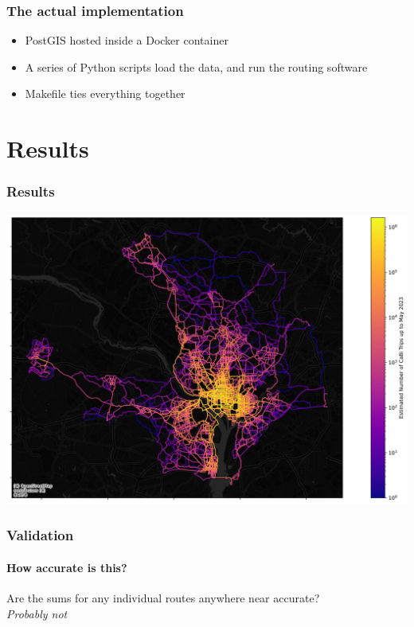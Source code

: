 \documentclass{beamer}
\begin{document}
\begin{frame}
    \frametitle{The actual implementation}

    \begin{itemize}
        \item<1-> PostGIS hosted inside a Docker container 
        \item<2-> A series of Python scripts load the data, and run the routing software
        \item<3-> Makefile ties everything together
    \end{itemize}

\end{frame}
\section{Results}
\begin{frame}
    \frametitle{Results}
    \includegraphics[width=\textwidth]{./network_stats.jpg}
\end{frame}
\begin{frame}
    \frametitle{Validation}
    \framesubtitle{How accurate is this?}

    Are the sums for any individual routes anywhere near accurate? \pause
    \\
    \emph{Probably not}

\end{frame}
\end{document}
